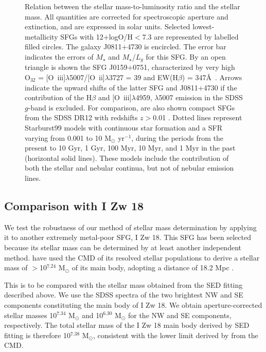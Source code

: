 \documentclass[useAMS,usenatbib]{mn2e}
\begin{document}
\begin{figure}%
\caption{Relation between the stellar mass-to-luminosity ratio
and the stellar mass. All quantities are corrected for spectroscopic
aperture and extinction, and are expressed in solar units.
Selected lowest-metallicity SFGs with 12+logO/H$<$7.3 are represented
by labelled filled circles. The galaxy J0811$+$4730 is encircled. 
The error bar indicates the errors of $M_\star$ and $M_\star$/$L_g$ for this SFG.
By an open triangle is shown the SFG J0159$+$0751, characterized by very high
O$_{32}$ = [O~{\sc iii}]$\lambda$5007/[O~{\sc ii}]$\lambda$3727 = 39 and
EW(H$\beta$) = 347\AA\ \citep*{I17}. Arrows indicate the upward shifts of the 
latter SFG and J0811$+$4730 if the contribution of the H$\beta$ and 
[O~{\sc iii}]$\lambda$4959, $\lambda$5007 emission in the SDSS $g$-band 
is excluded. For comparison, 
are also shown compact SFGs from the SDSS DR12 with redshifts $z$$>$0.01
\citep[grey dots, ][]{I16c}. Dotted lines represent {\sc Starburst99} models 
with continuous star formation and a SFR varying from 
0.001 to 10  M$_\odot$ yr$^{-1}$, during the periods from the present to 10 Gyr, 
1 Gyr, 100 Myr, 10 Myr, and 1 Myr in 
the past (horizontal solid lines). These models include the contribution of
both the stellar and nebular continua, but not of nebular emission lines.}
\label{fig3}
\end{figure}

\subsection{Comparison with I Zw 18}

We test the robustness of our method of stellar mass determination by applying it to 
another extremely metal-poor SFG, I Zw 18. This SFG has been selected because
its stellar mass can be determined by at least another independent method.
\citet{A13} have used the CMD of its resolved stellar populations 
to derive a stellar mass of $>$10$^{7.24}$ M$_\odot$ of its main body, adopting
a distance of 18.2 Mpc \citep{A07}. 

This is to be compared with the stellar mass obtained from the SED fitting
described above. We use the SDSS spectra of the two brightest NW and SE 
components constituting the main body of I Zw 18. We obtain aperture-corrected
stellar masses 10$^{7.34}$ M$_\odot$ and 10$^{6.30}$ M$_\odot$ for the NW and SE
components, respectively. The total stellar mass of the I Zw 18 main body derived by SED fitting is therefore 10$^{7.38}$ M$_\odot$, consistent with the lower limit derived by \citet{A13} from the CMD.
\end{document}
